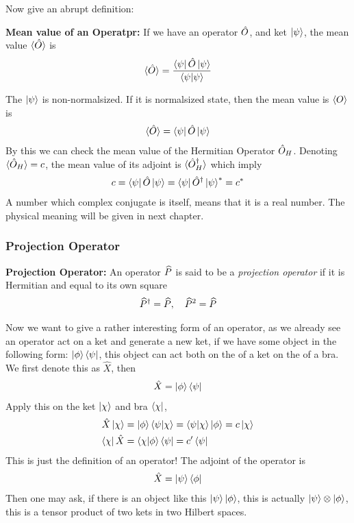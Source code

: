 Now give an abrupt definition:
\begin{definition}{\textbf{Mean value of an Operatpr:}}
    If we have an operator $\hat{O}$, and ket $\ket{\psi}$, the mean value $\langle \hat{O} \rangle$ is 
    \begin{eqnarray}
        \langle \hat{O} \rangle = \frac{\bra{\psi} \hat{O} \ket{\psi}}{\braket{\psi|\psi}}
    \end{eqnarray}
\end{definition}
The $\ket{\psi}$ is non-normalsized. If it is normalsized state, then the mean value is $\langle O \rangle$ is 
\begin{eqnarray}
    \langle \hat{O} \rangle = \bra{\psi} \hat{O} \ket{\psi}
\end{eqnarray}
By this we can check the mean value of the Hermitian Operator $\hat{O}_H$. Denoting $\langle \hat{O}_H \rangle = c$, the mean value of its adjoint is $\langle \hat{O}_H^ \dag \rangle$ which imply 
\begin{eqnarray}
    c = \bra{\psi} \hat{O} \ket{\psi} = \bra{\psi} \hat{O}^ \dag \ket{\psi}^* = c^* \label{eq:mean_Hermitian}
\end{eqnarray}
A number which complex conjugate is itself, means that it is a real number. The physical meaning will be given in next chapter.

\subsubsection{Projection Operator}
\begin{definition}{\textbf{Projection Operator:}}
    An operator $\widehat{P}$ is said to be a \emph{projection operator} if it is Hermitian and equal to its own square
    \begin{eqnarray}
        \widehat{P}^ \dag = \widehat{P}, \quad \widehat{P}^2 = \widehat{P} \label{eq:proj_charac}
    \end{eqnarray}
\end{definition}
Now we want to give a rather interesting form of an operator, as we already see an operator act on a ket and generate a new ket, if we have some object in the following form: $\ket{\phi} \bra{\psi}$, this object can act both on the \lhs of a ket on the \rhs of a bra. We first denote this as $\hat{X}$, then 
\begin{eqnarray}
    \hat{X} = \ket{\phi} \bra{\psi}
\end{eqnarray}
Apply this on the ket $\ket{\chi }$ and bra $\bra{\chi}$, 
\begin{align}
    \hat{X} \ket{\chi} &= \ket{\phi} \braket{\psi|\chi} = \braket{\psi|\chi} \ket{\phi} = c \ket{\chi}\label{eq:Xchi}\\
    \bra{\chi} \hat{X} &= \braket{\chi|\phi} \bra{\psi} = c' \bra{\psi} \mathstrut \label{eq:chiX}
\end{align}
This is just the definition of an operator! The adjoint of the operator is 
\begin{eqnarray}
    \hat{X} = \ket{\psi} \bra{\phi}
\end{eqnarray}
Then one may ask, if there is an object like this $\ket{\psi} \ket{\phi}$, this is actually $\ket{\psi} \otimes \ket{\phi}$, this is a tensor product of two kets in two Hilbert spaces.

